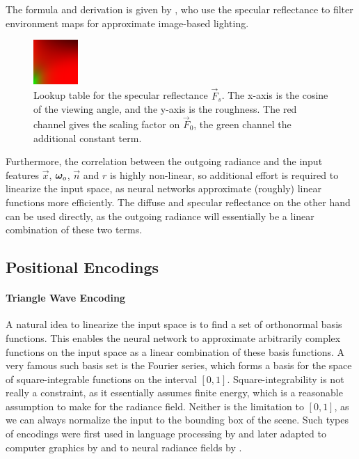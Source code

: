 The formula and derivation is given by \textcite{karis2013}, who use the specular reflectance to filter environment maps for approximate image-based lighting.
\begin{figure}[htb!]
    \centering
    \includegraphics[width=0.15\textwidth]{figures/lut.png}
    \caption{Lookup table for the specular reflectance $\vec{F}_s$. The x-axis is the cosine of the viewing angle, and the y-axis is the roughness. The red channel gives the scaling factor on $\vec{F}_0$, the green channel the additional constant term.}
    \label{fig:lut}
\end{figure}

Furthermore, the correlation between the outgoing radiance and the input features $\vec{x}$, ${\bm{\omega}_o}$, $\vec{n}$ and $r$ is highly non-linear, so additional effort is required to linearize the input space, as neural networks approximate (roughly) linear functions more efficiently.
The diffuse and specular reflectance on the other hand can be used directly, as the outgoing radiance will essentially be a linear combination of these two terms.

\subsection{Positional Encodings}

\paragraph{Triangle Wave Encoding}
A natural idea to linearize the input space is to find a set of orthonormal basis functions.
This enables the neural network to approximate arbitrarily complex functions on the input space as a linear combination of these basis functions.
A very famous such basis set is the Fourier series, which forms a basis for the space of square-integrable functions on the interval $[0, 1]$.
Square-integrability is not really a constraint, as it essentially assumes finite energy, which is a reasonable assumption to make for the radiance field.
Neither is the limitation to $[0, 1]$, as we can always normalize the input to the bounding box of the scene.
Such types of encodings were first used in language processing by \textcite{vaswani2017} and later adapted to computer graphics by \textcite{tancik2020} and to neural radiance fields by \textcite{mildenhall2020}.

